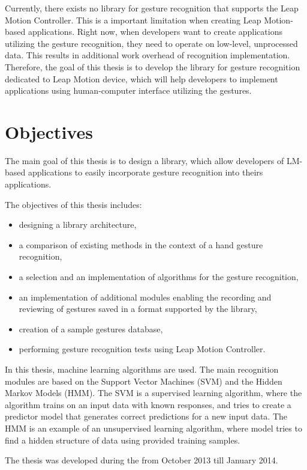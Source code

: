 Currently, there exists no library for gesture recognition that supports the Leap Motion Controller.
This is a important limitation when creating Leap Motion-based applications.
Right now, when developers want to create applications utilizing the gesture recognition, they need to operate on low-level, unprocessed data.
This results in additional work overhead of recognition implementation.
Therefore, the goal of this thesis is to develop the library for gesture recognition dedicated to Leap Motion device, which will help developers to implement applications using human-computer interface utilizing the gestures.


\section{Objectives}

The main goal of this thesis is to design a library, which allow developers of LM-based applications to easily incorporate gesture recognition into theirs applications.

The objectives of this thesis includes:
\begin{itemize}
\item designing a library architecture, 
\item a comparison of existing methods in the context of a hand gesture recognition,
\item a selection and an implementation of algorithms for the gesture recognition,
\item an implementation of additional modules enabling the recording and reviewing of gestures saved in a format supported by the library,
\item creation of a sample gestures database,
\item performing gesture recognition tests using Leap Motion Controller.
\end{itemize}

In this thesis, machine learning algorithms are used. 
The main recognition modules are based on the Support Vector Machines (SVM) and the Hidden Markov Models (HMM). 
The SVM is a supervised learning algorithm, where the algorithm trains on an input data with known responses, and tries to create a predictor model that generates correct predictions for a new input data.
The HMM is an example of an unsupervised learning algorithm, where model tries to find a hidden structure of data using provided training samples. 

The thesis was developed during the from October 2013 till January 2014.


